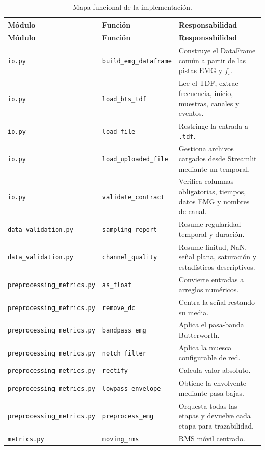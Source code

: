 \documentclass[11pt,spanish]{article}
\begin{document}
\begin{longtable}{p{3.5cm}p{4.2cm}p{6.8cm}}
\caption{Mapa funcional de la implementación.}
\label{tab:functions}\\
\toprule
\textbf{Módulo} & \textbf{Función} & \textbf{Responsabilidad}\\
\midrule
\endfirsthead
\toprule
\textbf{Módulo} & \textbf{Función} & \textbf{Responsabilidad}\\
\midrule
\endhead
\texttt{io.py} & \texttt{build\_emg\_dataframe} & Construye el DataFrame común a partir de las pistas EMG y $f_s$.\\
\texttt{io.py} & \texttt{load\_bts\_tdf} & Lee el TDF, extrae frecuencia, inicio, muestras, canales y eventos.\\
\texttt{io.py} & \texttt{load\_file} & Restringe la entrada a \texttt{.tdf}.\\
\texttt{io.py} & \texttt{load\_uploaded\_file} & Gestiona archivos cargados desde Streamlit mediante un temporal.\\
\texttt{io.py} & \texttt{validate\_contract} & Verifica columnas obligatorias, tiempos, datos EMG y nombres de canal.\\
\texttt{data\_validation.py} & \texttt{sampling\_report} & Resume regularidad temporal y duración.\\
\texttt{data\_validation.py} & \texttt{channel\_quality} & Resume finitud, NaN, señal plana, saturación y estadísticos descriptivos.\\
\texttt{preprocessing\_metrics.py} & \texttt{as\_float} & Convierte entradas a arreglos numéricos.\\
\texttt{preprocessing\_metrics.py} & \texttt{remove\_dc} & Centra la señal restando su media.\\
\texttt{preprocessing\_metrics.py} & \texttt{bandpass\_emg} & Aplica el pasa-banda Butterworth.\\
\texttt{preprocessing\_metrics.py} & \texttt{notch\_filter} & Aplica la muesca configurable de red.\\
\texttt{preprocessing\_metrics.py} & \texttt{rectify} & Calcula valor absoluto.\\
\texttt{preprocessing\_metrics.py} & \texttt{lowpass\_envelope} & Obtiene la envolvente mediante pasa-bajas.\\
\texttt{preprocessing\_metrics.py} & \texttt{preprocess\_emg} & Orquesta todas las etapas y devuelve cada etapa para trazabilidad.\\
\texttt{metrics.py} & \texttt{moving\_rms} & RMS móvil centrado.\\

\end{longtable}
\end{document}
